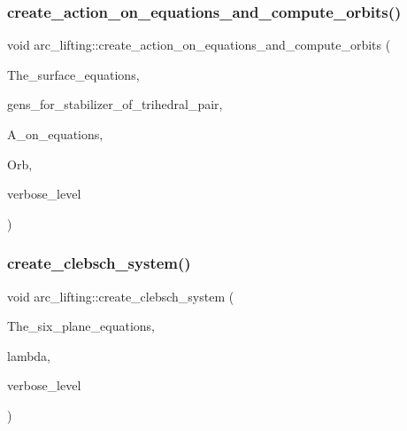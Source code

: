 \subsubsection{\texorpdfstring{create\+\_\+action\+\_\+on\+\_\+equations\+\_\+and\+\_\+compute\+\_\+orbits()}{create\_action\_on\_equations\_and\_compute\_orbits()}}
{\footnotesize\ttfamily void arc\+\_\+lifting\+::create\+\_\+action\+\_\+on\+\_\+equations\+\_\+and\+\_\+compute\+\_\+orbits (\begin{DoxyParamCaption}\item[{\mbox{\hyperlink{galois_8h_a09fddde158a3a20bd2dcadb609de11dc}{I\+NT}} $\ast$}]{The\+\_\+surface\+\_\+equations,  }\item[{\mbox{\hyperlink{classstrong__generators}{strong\+\_\+generators}} $\ast$}]{gens\+\_\+for\+\_\+stabilizer\+\_\+of\+\_\+trihedral\+\_\+pair,  }\item[{\mbox{\hyperlink{classaction}{action}} $\ast$\&}]{A\+\_\+on\+\_\+equations,  }\item[{\mbox{\hyperlink{classschreier}{schreier}} $\ast$\&}]{Orb,  }\item[{\mbox{\hyperlink{galois_8h_a09fddde158a3a20bd2dcadb609de11dc}{I\+NT}}}]{verbose\+\_\+level }\end{DoxyParamCaption})}

\mbox{\label{classarc__lifting_a70e7b6f208cc31296982de47a2114721}} 
\subsubsection{\texorpdfstring{create\+\_\+clebsch\+\_\+system()}{create\_clebsch\_system()}}
{\footnotesize\ttfamily void arc\+\_\+lifting\+::create\+\_\+clebsch\+\_\+system (\begin{DoxyParamCaption}\item[{\mbox{\hyperlink{galois_8h_a09fddde158a3a20bd2dcadb609de11dc}{I\+NT}} $\ast$}]{The\+\_\+six\+\_\+plane\+\_\+equations,  }\item[{\mbox{\hyperlink{galois_8h_a09fddde158a3a20bd2dcadb609de11dc}{I\+NT}}}]{lambda,  }\item[{\mbox{\hyperlink{galois_8h_a09fddde158a3a20bd2dcadb609de11dc}{I\+NT}}}]{verbose\+\_\+level }\end{DoxyParamCaption})}

